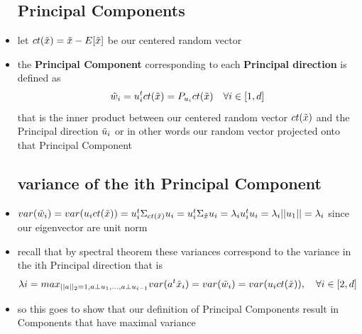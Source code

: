 \documentclass{article}
\begin{document}
\begin{itemize}
\subsection*{Principal Components}
\item let $ct(\Tilde{x})=\Tilde{x}-E[\Tilde{x}]$ be our centered random vector
\item the \textbf{Principal Component} corresponding to each \textbf{Principal direction} is defined as 
$$\Tilde{w}_{i}=u_{i}^{t}ct(\Tilde{x})= P_{u_{i}}ct(\Tilde{x})\quad \forall i\in [1,d]$$ that is the inner product between our centered random vector $ct(\Tilde{x})$ and the Principal direction $\Tilde{u}_{i}$ or in other words our random vector projected onto that Principal Component
\subsection*{variance of the ith Principal Component}
\item $var(\Tilde{w}_{i})=var(u_ict(\Tilde{x}))=u_i^{t}\Sigma_{ct(\Tilde{x})}u_i=u_i^{t}\Sigma_{\Tilde{x}}u_i=\lambda_i u_i^{t}u_i=\lambda_{i}||u_1||=\lambda_i$ since our eigenvector are unit norm 
\item recall that by spectral theorem these variances correspond to the variance in the ith Principal direction that is $$\lambda{i}=max_{||a||_2=1, a\perp u_1,\dots, a\perp u_{i-1}}var(a^t\Tilde{x}_{i})=var(\Tilde{w}_i)=var(u_ict(\Tilde{x})), \quad \forall i \in [2,d]$$
\item so this goes to show that our definition of Principal Components result in Components that have maximal variance

\end{itemize}
\end{document}
